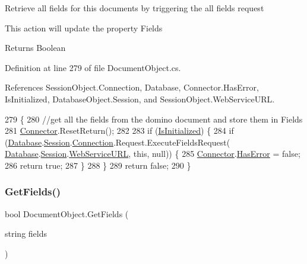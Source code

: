 Retrieve all fields for this documents by triggering the all fields request 

This action will update the property \textquotesingle{}Fields\textquotesingle{} 

\begin{DoxyReturn}{Returns}
Boolean
\end{DoxyReturn}


Definition at line 279 of file Document\+Object.\+cs.



References Session\+Object.\+Connection, Database, Connector.\+Has\+Error, Is\+Initialized, Database\+Object.\+Session, and Session\+Object.\+Web\+Service\+U\+RL.


\begin{DoxyCode}
279                                \{
280         \textcolor{comment}{//get all the fields from the domino document and store them in Fields}
281         \mbox{\hyperlink{class_connector}{Connector}}.ResetReturn();
282 
283         \textcolor{keywordflow}{if} (\mbox{\hyperlink{class_document_object_a3b2075b73f38d05091b69decc6ce7992}{IsInitialized}}) \{
284             \textcolor{keywordflow}{if} (\mbox{\hyperlink{class_document_object_a69d5338c9835f748490323d2950eed09}{Database}}.\mbox{\hyperlink{class_database_object_aa8484162b7d2a7c4c9426bca13c64c07}{Session}}.\mbox{\hyperlink{class_session_object_a014bdbf705a753540e19bfb53030c55c}{Connection}}.Request.ExecuteFieldsRequest(
      \mbox{\hyperlink{class_document_object_a69d5338c9835f748490323d2950eed09}{Database}}.\mbox{\hyperlink{class_database_object_aa8484162b7d2a7c4c9426bca13c64c07}{Session}}.\mbox{\hyperlink{class_session_object_a697c071c812fbf7ad1166b896fb44c16}{WebServiceURL}}, \textcolor{keyword}{this}, null)) \{
285                 \mbox{\hyperlink{class_connector}{Connector}}.\mbox{\hyperlink{class_connector_a9365777a6b7b711b75bcfa6c4d53e989}{HasError}} = \textcolor{keyword}{false};
286                 \textcolor{keywordflow}{return} \textcolor{keyword}{true};
287             \}
288         \}
289         \textcolor{keywordflow}{return} \textcolor{keyword}{false};
290     \}
\end{DoxyCode}
\mbox{\label{class_document_object_a8883fec3b5b1b6e2e43f4b5ca4092684}} 
\subsubsection{\texorpdfstring{Get\+Fields()}{GetFields()}\hspace{0.1cm}{\footnotesize\ttfamily [1/2]}}
{\footnotesize\ttfamily bool Document\+Object.\+Get\+Fields (\begin{DoxyParamCaption}\item[{string}]{fields }\end{DoxyParamCaption})}



